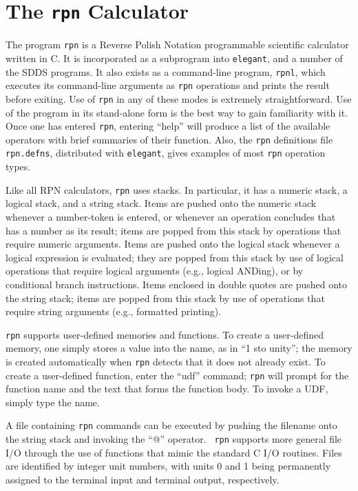 \documentclass[11pt]{article}
\begin{document}


\newpage
\section{The {\tt rpn} Calculator}

The program {\tt rpn} is a Reverse Polish Notation programmable
scientific calculator written in C.  It is incorporated as a
subprogram into {\tt elegant}, and a number of the SDDS programs.  It
also exists as a command-line program, {\tt rpnl}, which executes its
command-line arguments as {\tt rpn} operations and prints the result
before exiting.  Use of {\tt rpn} in any of these modes is extremely
straightforward.  Use of the program in its stand-alone form is the
best way to gain familiarity with it.  Once one has entered {\tt rpn},
entering ``help'' will produce a list of the available operators with
brief summaries of their function.  Also, the {\tt rpn} definitions
file \verb|rpn.defns|, distributed with {\tt elegant}, gives examples
of most {\tt rpn} operation types.

Like all RPN calculators, {\tt rpn} uses stacks.  In particular, it
has a numeric stack, a logical stack, and a string stack.  Items are
pushed onto the numeric stack whenever a number-token is entered, or
whenever an operation concludes that has a number as its result; items
are popped from this stack by operations that require numeric
arguments.  Items are pushed onto the logical stack whenever a logical
expression is evaluated; they are popped from this stack by use of
logical operations that require logical arguments (e.g., logical
ANDing), or by conditional branch instructions.  Items enclosed in
double quotes are pushed onto the string stack; items are popped from
this stack by use of operations that require string arguments (e.g.,
formatted printing).

{\tt rpn} supports user-defined memories and functions.  To create a
user-defined memory, one simply stores a value into the name, as in
``1 sto unity''; the memory is created automatically when {\tt rpn}
detects that it does not already exist.  To create a user-defined
function, enter the ``udf'' command; {\tt rpn} will prompt for the
function name and the text that forms the function body.  To invoke a
UDF, simply type the name.

A file containing {\tt rpn} commands can be executed by pushing the
filename onto the string stack and invoking the ``@'' operator.  {\tt
rpn} supports more general file I/O through the use of functions that
mimic the standard C I/O routines.  Files are identified by integer
unit numbers, with units 0 and 1 being permanently assigned to the
terminal input and terminal output, respectively.
\end{document}
